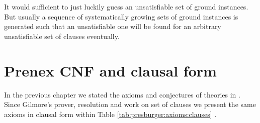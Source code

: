 It would sufficient to just luckily guess an unsatisfiable set of ground instances. 
But usually a sequence of systematically growing sets of ground instances is generated 
such that an unsatisfiable one will be found 
for an arbitrary unsatisfiable set of clauses
eventually.



%
%
%
%
%



\section{Prenex CNF and clausal form}

In the previous chapter we stated the axioms and conjectures of theories in \FOF. 
Since Gilmore's prover, resolution and \InstGen work on set of clauses we present
the same axioms in clausal form within Table 
\ref{tab:presburger:axioms:clauses} .

